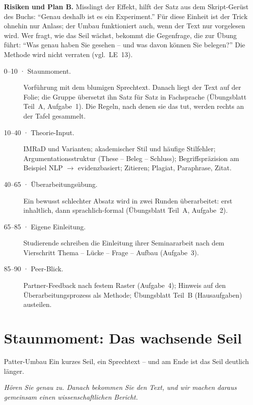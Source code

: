 \begin{vorbereitung}
\textbf{Risiken und Plan B.} Misslingt der Effekt, hilft der Satz aus
dem Skript-Gerüst des Buchs: \enquote{Genau deshalb ist es ein
Experiment.} Für diese Einheit ist der Trick ohnehin nur Anlass; der Umbau
funktioniert auch, wenn der Text nur vorgelesen wird. Wer fragt, wie das
Seil wächst, bekommt die Gegenfrage, die zur Übung führt: \enquote{Was
genau haben Sie gesehen -- und was davon können Sie belegen?} Die Methode
wird nicht verraten (vgl.\ LE~13).
\end{vorbereitung}

\begin{ablauf}
\begin{description}
\item[0--10 · Staunmoment.] Vorführung mit dem blumigen Sprechtext. Danach
  liegt der Text auf der Folie; die Gruppe übersetzt ihn Satz für Satz in
  Fachsprache (Übungsblatt Teil~A, Aufgabe~1). Die Regeln, nach denen
  sie das tut, werden rechts an der Tafel gesammelt.
\item[10--40 · Theorie-Input.] IMRaD und Varianten; akademischer Stil und
  häufige Stilfehler; Argumentationsstruktur (These -- Beleg -- Schluss);
  Begriffspräzision am Beispiel NLP $\to$ evidenzbasiert; Zitieren;
  Plagiat, Paraphrase, Zitat.
\item[40--65 · Überarbeitungsübung.] Ein bewusst schlechter Absatz wird in
  zwei Runden überarbeitet: erst inhaltlich, dann sprachlich-formal
  (Übungsblatt Teil~A, Aufgabe~2).
\item[65--85 · Eigene Einleitung.] Studierende schreiben die Einleitung
  ihrer Seminararbeit nach dem Vierschritt Thema -- Lücke -- Frage --
  Aufbau (Aufgabe~3).
\item[85--90 · Peer-Blick.] Partner-Feedback nach festem Raster
  (Aufgabe~4); Hinweis auf den Überarbeitungsprozess als Methode;
  Übungsblatt Teil~B (Hausaufgaben) austeilen.
\end{description}
\end{ablauf}

\section{Staunmoment: Das wachsende Seil}
\label{sec:le11-patter}
\begin{staunbox}{Patter-Umbau}
Ein kurzes Seil, ein Sprechtext -- und am Ende ist das Seil deutlich länger.

\medskip
\emph{Hören Sie genau zu. Danach bekommen Sie den Text, und wir machen
daraus gemeinsam einen wissenschaftlichen Bericht.}
\end{staunbox}
\os{\newpage}

